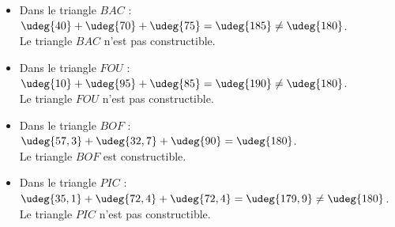    \begin{itemize}
      \item Dans le triangle $BAC$ : \\
         $\udeg{40}+\udeg{70}+\udeg{75} =\udeg{185} \neq \udeg{180}$. \\
         {\blue Le triangle $BAC$ n'est pas constructible}.
      \item Dans le triangle $FOU$ : \\
         $\udeg{10}+\udeg{95}+\udeg{85} =\udeg{190} \neq \udeg{180}$. \\
         {\blue Le triangle $FOU$ n'est pas constructible}.
      \item Dans le triangle $BOF$ : \\
         $\udeg{57,3}+\udeg{32,7}+\udeg{90} =\udeg{180}$. \\
         {\blue Le triangle $BOF$ est constructible}.
      \item Dans le triangle $PIC$ : \\
         $\udeg{35,1}+\udeg{72,4}+\udeg{72,4} =\udeg{179,9} \neq \udeg{180}$. \\
         {\blue Le triangle $PIC$ n'est pas constructible}.
   \end{itemize}
